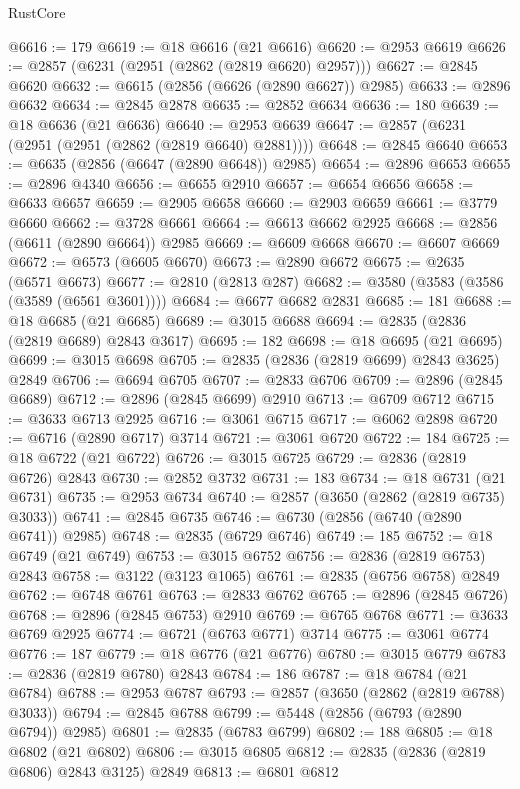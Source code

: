 \begin{lexlean}{RustCore}
\begin{coremodule}
@6616 := 179
@6619 := @18 @6616 (@21 @6616)
@6620 := @2953 @6619
@6626 := @2857 (@6231 (@2951 (@2862 (@2819 @6620) @2957)))
@6627 := @2845 @6620
@6632 := @6615 (@2856 (@6626 (@2890 @6627)) @2985)
@6633 := @2896 @6632
@6634 := @2845 @2878
@6635 := @2852 @6634
@6636 := 180
@6639 := @18 @6636 (@21 @6636)
@6640 := @2953 @6639
@6647 := @2857 (@6231 (@2951 (@2951 (@2862 (@2819 @6640) @2881))))
@6648 := @2845 @6640
@6653 := @6635 (@2856 (@6647 (@2890 @6648)) @2985)
@6654 := @2896 @6653
@6655 := @2896 @4340
@6656 := @6655 @2910
@6657 := @6654 @6656
@6658 := @6633 @6657
@6659 := @2905 @6658
@6660 := @2903 @6659
@6661 := @3779 @6660
@6662 := @3728 @6661
@6664 := @6613 @6662 @2925
@6668 := @2856 (@6611 (@2890 @6664)) @2985
@6669 := @6609 @6668
@6670 := @6607 @6669
@6672 := @6573 (@6605 @6670)
@6673 := @2890 @6672
@6675 := @2635 (@6571 @6673)
@6677 := @2810 (@2813 @287)
@6682 := @3580 (@3583 (@3586 (@3589 (@6561 @3601))))
@6684 := @6677 @6682 @2831
@6685 := 181
@6688 := @18 @6685 (@21 @6685)
@6689 := @3015 @6688
@6694 := @2835 (@2836 (@2819 @6689) @2843 @3617)
@6695 := 182
@6698 := @18 @6695 (@21 @6695)
@6699 := @3015 @6698
@6705 := @2835 (@2836 (@2819 @6699) @2843 @3625) @2849
@6706 := @6694 @6705
@6707 := @2833 @6706
@6709 := @2896 (@2845 @6689)
@6712 := @2896 (@2845 @6699) @2910
@6713 := @6709 @6712
@6715 := @3633 @6713 @2925
@6716 := @3061 @6715
@6717 := @6062 @2898
@6720 := @6716 (@2890 @6717) @3714
@6721 := @3061 @6720
@6722 := 184
@6725 := @18 @6722 (@21 @6722)
@6726 := @3015 @6725
@6729 := @2836 (@2819 @6726) @2843
@6730 := @2852 @3732
@6731 := 183
@6734 := @18 @6731 (@21 @6731)
@6735 := @2953 @6734
@6740 := @2857 (@3650 (@2862 (@2819 @6735) @3033))
@6741 := @2845 @6735
@6746 := @6730 (@2856 (@6740 (@2890 @6741)) @2985)
@6748 := @2835 (@6729 @6746)
@6749 := 185
@6752 := @18 @6749 (@21 @6749)
@6753 := @3015 @6752
@6756 := @2836 (@2819 @6753) @2843
@6758 := @3122 (@3123 @1065)
@6761 := @2835 (@6756 @6758) @2849
@6762 := @6748 @6761
@6763 := @2833 @6762
@6765 := @2896 (@2845 @6726)
@6768 := @2896 (@2845 @6753) @2910
@6769 := @6765 @6768
@6771 := @3633 @6769 @2925
@6774 := @6721 (@6763 @6771) @3714
@6775 := @3061 @6774
@6776 := 187
@6779 := @18 @6776 (@21 @6776)
@6780 := @3015 @6779
@6783 := @2836 (@2819 @6780) @2843
@6784 := 186
@6787 := @18 @6784 (@21 @6784)
@6788 := @2953 @6787
@6793 := @2857 (@3650 (@2862 (@2819 @6788) @3033))
@6794 := @2845 @6788
@6799 := @5448 (@2856 (@6793 (@2890 @6794)) @2985)
@6801 := @2835 (@6783 @6799)
@6802 := 188
@6805 := @18 @6802 (@21 @6802)
@6806 := @3015 @6805
@6812 := @2835 (@2836 (@2819 @6806) @2843 @3125) @2849
@6813 := @6801 @6812

\end{coremodule}
\end{lexlean}
